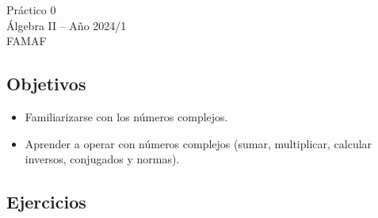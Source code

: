 \documentclass[a4paper,12pt,twoside,spanish,reqno]{amsbook}
\numberwithin{equation}{section}
\begin{document}
    
    
    {\bf \begin{center} Práctico 0 \\ Álgebra  II -- Año 2024/1 \\ FAMAF \end{center}}
    


\bigbreak

\subsection*{Objetivos}

\begin{itemize}
 \item Familiarizarse con los números complejos.
 \item Aprender a operar con números complejos (sumar, multiplicar, calcular inversos, conjugados y normas).
\end{itemize}

\subsection*{Ejercicios}
\end{document}
